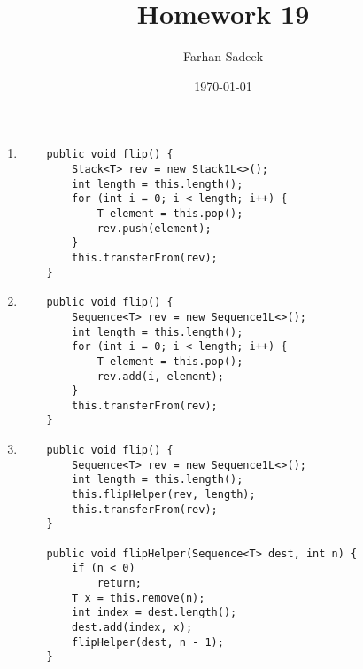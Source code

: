 \documentclass{article}
\begin{document}
\title{Homework 19}
\author{Farhan Sadeek}
\date{\today}

\maketitle


\begin{enumerate}
    \item
    \begin{verbatim}
    public void flip() {
        Stack<T> rev = new Stack1L<>();
        int length = this.length();
        for (int i = 0; i < length; i++) {
            T element = this.pop();
            rev.push(element);
        }
        this.transferFrom(rev);
    }
    \end{verbatim}

    \item
    \begin{verbatim}
    public void flip() {
        Sequence<T> rev = new Sequence1L<>();
        int length = this.length();
        for (int i = 0; i < length; i++) {
            T element = this.pop();
            rev.add(i, element);
        }
        this.transferFrom(rev);
    }
    \end{verbatim}

    \item
    \begin{verbatim}
    public void flip() {
        Sequence<T> rev = new Sequence1L<>();
        int length = this.length();
        this.flipHelper(rev, length);
        this.transferFrom(rev);
    }

    public void flipHelper(Sequence<T> dest, int n) {
        if (n < 0)
            return;
        T x = this.remove(n);
        int index = dest.length();
        dest.add(index, x);
        flipHelper(dest, n - 1);
    }
    \end{verbatim}
\end{enumerate}
\end{document}
